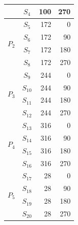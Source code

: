 \begin{table}[H]
\begin{minipage}[t]{0.32\linewidth}
\begin{tabular}{c c r r}
                        & $S_4$  & 100 & 270 \\
\midrule
\multirow{4}{*}{$P_2$} & $S_5$  & 172 &   0 \\
                        & $S_6$  & 172 &  90 \\
                        & $S_7$  & 172 & 180 \\
                        & $S_8$  & 172 & 270 \\
\midrule
\multirow{4}{*}{$P_3$} & $S_9$  & 244 &   0 \\
                        & $S_{10}$ & 244 &  90 \\
                        & $S_{11}$ & 244 & 180 \\
                        & $S_{12}$ & 244 & 270 \\
\midrule
\multirow{4}{*}{$P_4$} & $S_{13}$ & 316 &   0 \\
                        & $S_{14}$ & 316 &  90 \\
                        & $S_{15}$ & 316 & 180 \\
                        & $S_{16}$ & 316 & 270 \\
\midrule
\multirow{4}{*}{$P_5$} & $S_{17}$ &  28 &   0 \\
                        & $S_{18}$ &  28 &  90 \\
                        & $S_{19}$ &  28 & 180 \\
                        & $S_{20}$ &  28 & 270 \\
\bottomrule
\end{tabular}
\end{minipage}
\end{table}
